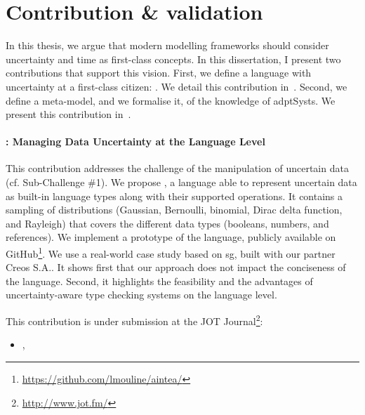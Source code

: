 \section{Contribution \& validation}
\label{sec:intro:contrib}

In this thesis, we argue that modern modelling frameworks should consider uncertainty and time as first-class concepts.
In this dissertation, I present two contributions that support this vision.
First, we define a language with uncertainty at a first-class citizen: \langName.
We detail this contribution in~.
Second, we define a meta-model, and we formalise it, of the knowledge of \glspl{adptSyst}.
We present this contribution in~.

\paragraph{\langName{}: Managing Data Uncertainty at the Language Level}
This contribution addresses the challenge of the manipulation of uncertain data (cf. Sub-Challenge \#1). 
We propose \langName{}, a language able to represent uncertain data as built-in language types along with their supported operations. 
 It contains a sampling of distributions (Gaussian, Bernoulli, binomial, Dirac delta function, and Rayleigh) that covers the different data types (booleans, numbers, and references).
 We implement a prototype of the language, publicly available on GitHub\footnote{\url{https://github.com/lmouline/aintea/}}.
 We use a real-world case study based on \gls{sg}, built with our partner Creos S.A..
It shows first that our approach does not impact the conciseness of the language.
Second, it highlights the feasibility and the advantages of uncertainty-aware type checking systems on the language level.

This contribution is under submission at the JOT Journal\footnote{\url{http://www.jot.fm/}}:
\begin{itemize}
	\item {}, \citeauthor{insubmission:2019:comlan:datauncertainty}
\end{itemize}

